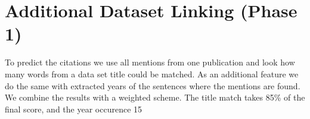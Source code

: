 \section{Additional Dataset Linking (Phase 1)}

To predict the citations we use all mentions from one publication and look how many words from a data set title could be matched. As an additional feature we do the same with extracted years of the sentences where the mentions are found. We combine the results with a weighted scheme. The title match takes 85\% of the final score, and the year occurence 15%